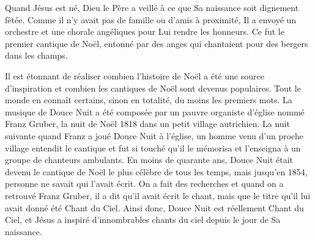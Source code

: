 


Quand Jésus est né, Dieu le Père a veillé à ce que Sa naissance soit dignement fêtée. Comme il n'y avait pas de famille ou d'amis à proximité, Il a envoyé un orchestre et une chorale angéliques pour Lui rendre les honneurs. Ce fut le premier cantique de Noël, entonné par des anges qui chantaient pour des bergers dans les champs.

Il est étonnant de réaliser combien l'histoire de Noël a été une source d'inspiration et combien les cantiques de Noël sont devenus populaires. Tout le monde en connaît certains, sinon en totalité, du moins les premiers mots. La musique de Douce Nuit a été composée par un pauvre organiste d'église nommé Franz Gruber, la nuit de Noël 1818 dans un petit village autrichien. La nuit suivante quand Franz a joué Douce Nuit à l'église, un homme venu d'un proche village entendit le cantique et fut si touché qu'il le mémorisa et l'enseigna à un groupe de chanteurs ambulants. En moins de quarante ans, Douce Nuit était devenu le cantique de Noël le plus célèbre de tous les temps, mais jusqu'en 1854, personne ne savait qui l'avait écrit. On a fait des recherches et quand on a retrouvé Franz Gruber, il a dit qu'il avait écrit le chant, mais que le titre qu'il lui avait donné été Chant du Ciel. Ainsi donc, Douce Nuit est réellement Chant du Ciel, et Jésus a inspiré d'innombrables chants du ciel depuis le jour de Sa naissance. 


